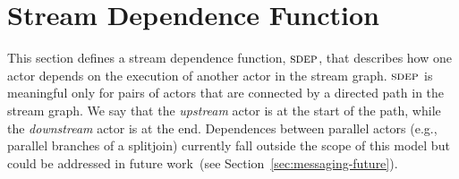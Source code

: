 \clearpage
 \addtocounter{page}{-1} 
\noindent 
\clearpage
\begin{figure}[t]
\vspace{-1in}
\hspace{-1in}
\end{figure}
\clearpage
%
\section{Stream Dependence Function}
\label{sec:sdep}

This section defines a stream dependence function, $\textsc{sdep}$, that
describes how one actor depends on the execution of another actor in
the stream graph.  $\textsc{sdep}$ is meaningful only for pairs of actors that
are connected by a directed path in the stream graph.  We say that the
{\it upstream} actor is at the start of the path, while the {\it
downstream} actor is at the end.  Dependences between parallel actors
(e.g., parallel branches of a splitjoin) currently fall outside the
scope of this model but could be addressed in future work~(see
Section~\ref{sec:messaging-future}).

